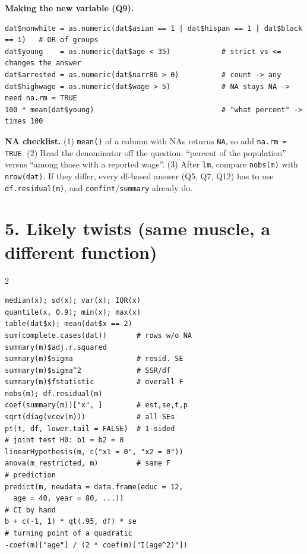 \documentclass[10pt]{article}
\newcommand{\code}[1]{\texttt{#1}}
\begin{document}
\textbf{Making the new variable (Q9).}
\begin{lstlisting}
dat$nonwhite = as.numeric(dat$asian == 1 | dat$hispan == 1 | dat$black == 1)   # OR of groups
dat$young    = as.numeric(dat$age < 35)            # strict vs <= changes the answer
dat$arrested = as.numeric(dat$narr86 > 0)          # count -> any
dat$highwage = as.numeric(dat$wage > 5)            # NA stays NA -> need na.rm = TRUE
100 * mean(dat$young)                              # "what percent" -> times 100
\end{lstlisting}

\begin{trap}
\textbf{NA checklist.} (1) \code{mean()} of a column with NAs returns \code{NA}, so add \code{na.rm = TRUE}. (2) Read the denominator off the question: ``percent of the population'' versus ``among those with a reported wage''. (3) After \code{lm}, compare \code{nobs(m)} with \code{nrow(dat)}. If they differ, every df-based answer (Q5, Q7, Q12) has to use \code{df.residual(m)}, and \code{confint}/\code{summary} already do.
\end{trap}

\section*{5. Likely twists (same muscle, a different function)}
\begin{multicols}{2}\small
\begin{lstlisting}
median(x); sd(x); var(x); IQR(x)
quantile(x, 0.9); min(x); max(x)
table(dat$x); mean(dat$x == 2)
sum(complete.cases(dat))       # rows w/o NA
summary(m)$adj.r.squared
summary(m)$sigma               # resid. SE
summary(m)$sigma^2             # SSR/df
summary(m)$fstatistic          # overall F
nobs(m); df.residual(m)
coef(summary(m))["x", ]        # est,se,t,p
sqrt(diag(vcov(m)))            # all SEs
pt(t, df, lower.tail = FALSE)  # 1-sided
# joint test H0: b1 = b2 = 0
linearHypothesis(m, c("x1 = 0", "x2 = 0"))
anova(m_restricted, m)         # same F
# prediction
predict(m, newdata = data.frame(educ = 12,
  age = 40, year = 80, ...))
# CI by hand
b + c(-1, 1) * qt(.95, df) * se
# turning point of a quadratic
-coef(m)["age"] / (2 * coef(m)["I(age^2)"])
\end{lstlisting}
\end{multicols}
\end{document}
